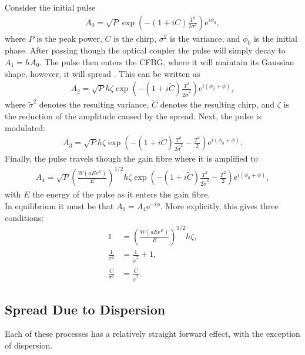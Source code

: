 Consider the initial pulse
\begin{align*}
	A_0 = \sqrt{P} \exp \left( -(1 + iC) \frac{T^2}{2 \sigma^2} \right) \textrm{e}^{i \phi_0},
\end{align*}
where $P$ is the peak power, $C$ is the chirp, $\sigma^2$ is the variance, and $\phi_0$ is the initial phase. After passing though the optical coupler the pulse will simply decay to $A_1 = h A_0$. The pulse then enters the CFBG, where it will maintain its Gaussian shape, however, it will spread \cite{agrawal2013, ferreira, silfvast}. This can be written as
\begin{align*}
A_2 = \sqrt{P} h \zeta \exp \left( -(1 + i \widetilde{C}) \frac{T^2}{2 \widetilde{\sigma}^2} \right) \textrm{e}^{i(\phi_0 + \phi)},
\end{align*}
where $\widetilde{\sigma}^2$ denotes the resulting variance, $\widetilde{C}$ denotes the resulting chirp, and $\zeta$ is the reduction of the amplitude caused by the spread. Next, the pulse is modulated:
\begin{align*}
A_3 = \sqrt{P} h \zeta \exp \left( -(1 + i \widetilde{C}) \frac{T^2}{2 \widetilde{\sigma}^2} - \frac{T^2}{2} \right) \textrm{e}^{i(\phi_0 + \phi)}.
\end{align*}
Finally, the pulse travels though the gain fibre where it is amplified to
\begin{align*}
A_4 = \sqrt{P} \left( \frac{W(a E \textrm{e}^E)}{E} \right)^{1/2} h \zeta \exp \left( -(1 + i \widetilde{C}) \frac{T^2}{2 \widetilde{\sigma}^2} - \frac{T^2}{2} \right) \textrm{e}^{i(\phi_0 + \phi)},
\end{align*}
with $E$ the energy of the pulse as it enters the gain fibre. \\

In equilibrium it must be that $A_0 = A_4 \textrm{e}^{-i \phi}$. More explicitly, this gives three conditions:
\begin{subequations}
\begin{align}
\label{eq:energycond}
1 &= \left( \frac{W(a E \textrm{e}^E)}{E} \right)^{1/2} h \zeta, \\
\label{eq:varcond}
\frac{1}{\sigma^2} &= \frac{1}{\widetilde{\sigma}^2} + 1, \\
\label{eq:chirpcond}
\frac{C}{\sigma^2} &= \frac{\widetilde{C}}{\widetilde{\sigma}^2}.
\end{align}
\label{eq:linsys}
\end{subequations}

\subsection{Spread Due to Dispersion}
Each of these processes has a relatively straight forward effect, with the exception of dispersion.


